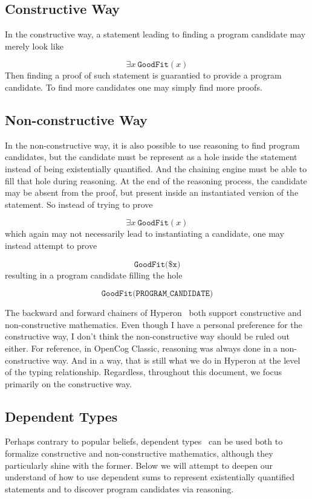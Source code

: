 \documentclass[]{report}
\begin{document}
\subsection{Constructive Way}

In the constructive way, a statement leading to finding a program
candidate may merely look like

$$\exists x\ \texttt{GoodFit}(x)$$ Then finding a proof of such
statement is guarantied to provide a program candidate.  To find more
candidates one may simply find more proofs.

\subsection{Non-constructive Way}

In the non-constructive way, it is also possible to use reasoning to
find program candidates, but the candidate must be represent as a hole
inside the statement instead of being existentially quantified.  And
the chaining engine must be able to fill that hole during reasoning.
At the end of the reasoning process, the candidate may be absent from
the proof, but present inside an instantiated version of the
statement.  So instead of trying to prove

$$\exists x\ \texttt{GoodFit}(x)$$ which again may not necessarily
lead to instantiating a candidate, one may instead attempt to prove

$$\texttt{GoodFit(\$x)}$$ resulting in a program candidate filling the
hole

$$\texttt{GoodFit(PROGRAM\_CANDIDATE)}$$

The backward and forward chainers of Hyperon~\cite{Chaining} both
support constructive and non-constructive mathematics.  Even though I
have a personal preference for the constructive way, I don't think the
non-constructive way should be ruled out either.  For reference, in
OpenCog Classic, reasoning was always done in a non-constructive way.
And in a way, that is still what we do in Hyperon at the level of the
typing relationship.
Regardless, throughout this document, we focus primarily on the
constructive way.

\subsection{Dependent Types}
Perhaps contrary to popular beliefs, dependent
types~\cite{DependentTypes} can be used both to formalize constructive
and non-constructive mathematics, although they particularly shine
with the former.  Below we will attempt to deepen our understand of
how to use dependent sums to represent existentially quantified
statements and to discover program candidates via reasoning.
\end{document}
